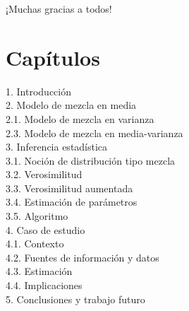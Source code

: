\documentclass[11pt]{book}
\begin{document}
¡Muchas gracias a todos!








\chapter*{Capítulos}
	
	1. Introducción\\
	2. Modelo de mezcla en media\\
	2.1. Modelo de mezcla en varianza\\
	2.3. Modelo de mezcla en media-varianza\\
	3. Inferencia estadística\\
	3.1. Noción de distribución tipo mezcla\\
	3.2. Verosimilitud\\
	3.3. Verosimilitud aumentada\\
	3.4. Estimación de parámetros\\
	3.5. Algoritmo\\
	4. Caso de estudio\\
	4.1. Contexto\\
	4.2. Fuentes de información y datos\\
	4.3. Estimación\\
	4.4. Implicaciones\\
	5. Conclusiones y trabajo futuro\\
	

\mainmatter %
\pagestyle{headings}
\end{document}
